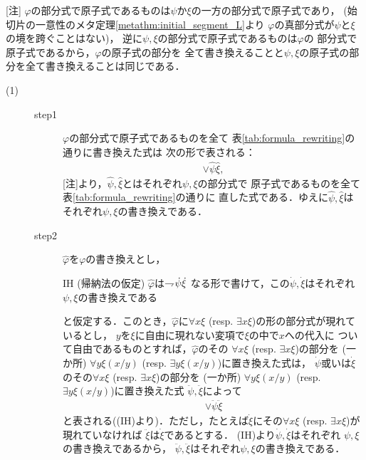 	\begin{metaprf}\mbox{}
		[注] $\varphi$の部分式で原子式であるものは$\psi$か$\xi$の一方の部分式で原子式であり，
		(始切片の一意性のメタ定理\ref{metathm:initial_segment_L}より
		$\varphi$の真部分式が$\psi$と$\xi$の境を跨ぐことはない)，
		逆に$\psi,\xi$の部分式で原子式であるものは$\varphi$の
		部分式で原子式であるから，$\varphi$の原子式の部分を
		全て書き換えることと$\psi,\xi$の原子式の部分を全て書き換えることは同じである．
		\begin{description}
			\item[(1)] 
				\begin{description}
					\item[step1]
						$\varphi$の部分式で原子式であるものを全て
						表\ref{tab:formula_rewriting}の通りに書き換えた式は
						次の形で表される：
						\begin{align}
							\vee \hat{\psi} \hat{\xi},
						\end{align}
						[注]より，$\hat{\psi},\hat{\xi}$とはそれぞれ$\psi,\xi$の部分式で
						原子式であるものを全て表\ref{tab:formula_rewriting}の通りに
						直した式である．ゆえに$\hat{\psi},\hat{\xi}$は
						それぞれ$\psi,\xi$の書き換えである．
						
					\item[step2]
						$\widehat{\varphi}$を$\varphi$の書き換えとし，
						\begin{itembox}[l]{IH (帰納法の仮定)}
							$\widehat{\varphi}$は$\rightharpoondown\hspace{-0.25em} \dot{\psi} \dot{\xi}$
							なる形で書けて，この$\dot{\psi},\dot{\xi}$はそれぞれ
							$\psi,\xi$の書き換えである
						\end{itembox}
						と仮定する．このとき，$\widehat{\varphi}$に$\forall x \xi$ 
						(resp. $\exists x \xi$)の形の部分式が現れているとし，
						$y$を$\xi$に自由に現れない変項で$\xi$の中で$x$への代入に
						ついて自由であるものとすれば，$\widehat{\varphi}$のその
						$\forall x \xi$ (resp. $\exists x \xi$)の部分を
						(一か所) $\forall y \xi(x/y)$
						(resp. $\exists y \xi(x/y)$)に置き換えた式は，
						$\dot{\psi}$或いは$\dot{\xi}$のその$\forall x \xi$
						(resp. $\exists x \xi$)の部分を
						(一か所) $\forall y \xi(x/y)$
						(resp. $\exists y \xi(x/y)$)に置き換えた式
						$\ddot{\psi},\ddot{\xi}$によって
						\begin{align}
							\vee \ddot{\psi} \ddot{\xi}
						\end{align}
						と表される((IH)より)．ただし，たとえば$\dot{\xi}$にその$\forall x \xi$
						(resp. $\exists x \xi$)が現れていなければ
						$\ddot{\xi}$は$\dot{\xi}$であるとする．
						(IH)より$\dot{\psi},\dot{\xi}$はそれぞれ
						$\psi,\xi$の書き換えであるから，
						$\ddot{\psi},\ddot{\xi}$はそれぞれ$\psi,\xi$の書き換えである．
				\end{description}
				

\end{description}
\end{metaprf}
